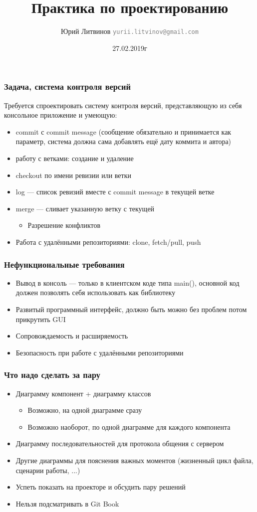 \documentclass[xetex,mathserif,serif]{beamer}
\title{Практика по проектированию}
\author[Юрий Литвинов]{Юрий Литвинов \newline \textcolor{gray}{\small\texttt{yurii.litvinov@gmail.com}}}
\date{27.02.2019г}
\begin{document}
	
	\frame{\titlepage}

	\begin{frame}
		\frametitle{Задача, система контроля версий}
		Требуется спроектировать систему контроля версий, представляющую из себя консольное приложение и умеющую:
		\begin{itemize}
			\item commit с commit message (сообщение обязательно и принимается как параметр, система должна сама добавлять ещё дату коммита и автора)
			\item работу с ветками: создание и удаление
			\item checkout по имени ревизии или ветки
			\item log --- список ревизий вместе с commit message в текущей ветке
			\item merge --- сливает указанную ветку с текущей
			\begin{itemize}
				\item Разрешение конфликтов
			\end{itemize}
			\item Работа с удалёнными репозиториями: clone, fetch/pull, push
		\end{itemize}
	\end{frame}

	\begin{frame}
		\frametitle{Нефункциональные требования}
		\begin{itemize}
			\item Вывод в консоль --- только в клиентском коде типа main(), основной код должен позволять себя использовать как библиотеку
			\item Развитый программный интерфейс, должно быть можно без проблем потом прикрутить GUI
			\item Сопровождаемость и расширяемость
			\item Безопасность при работе с удалёнными репозиториями
		\end{itemize}
	\end{frame}

	\begin{frame}
		\frametitle{Что надо сделать за пару}
		\begin{itemize}
			\item Диаграмму компонент + диаграмму классов
			\begin{itemize}
				\item Возможно, на одной диаграмме сразу
				\item Возможно наоборот, по одной диаграмме для каждого компонента
			\end{itemize}
			\item Диаграмму последовательностей для протокола общения с сервером
			\item Другие диаграммы для пояснения важных моментов (жизненный цикл файла, сценарии работы, ...)
			\item Успеть показать на проекторе и обсудить пару решений
			\item Нельзя подсматривать в Git Book
		\end{itemize}
	\end{frame}
\end{document}
